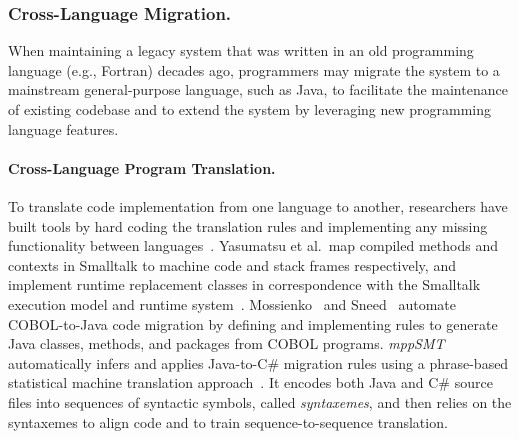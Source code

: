 \subsubsection{Cross-Language Migration.} 
When maintaining a legacy system that was written in an old programming language (e.g., Fortran) decades ago, programmers may migrate the system to a mainstream general-purpose language, such as Java, to facilitate the maintenance of existing codebase and to extend the system by leveraging new programming language features. 

\paragraph{{Cross-Language Program Translation.}}
To translate code implementation from one language to another, researchers have built tools by hard coding the translation rules and implementing any missing functionality between languages~\cite{Yasumatsu:95,1192409:03,Sneed:2010}. 
Yasumatsu et al.~map compiled methods and contexts in Smalltalk to machine code and stack frames respectively, and implement runtime replacement classes in correspondence with the Smalltalk execution model and runtime system~\cite{Yasumatsu:95}. Mossienko~\cite{1192409:03} and Sneed~\cite{Sneed:2010} automate COBOL-to-Java code migration by defining and implementing rules to generate Java classes, methods, and packages from COBOL programs. 
{\em mppSMT} automatically infers and applies Java-to-C\# migration rules using a phrase-based statistical machine translation approach~\cite{7372046}. It encodes both Java and C\# source files into sequences of syntactic symbols, called {\em syntaxemes}, and then relies on the syntaxemes to align code and to train sequence-to-sequence translation. 

